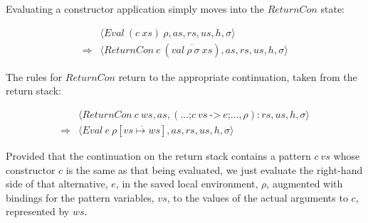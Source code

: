 Evaluating a constructor application simply moves into the $\mathit{ReturnCon}$ state:
\begin{mdframed}
\begin{equation}
\begin{array}{cl}
 & \langle \mathit{Eval}~(c~\mathit{xs})~\rho, \mathit{as}, \mathit{rs}, \mathit{us}, h, \sigma \rangle \\[0.25cm]
\Longrightarrow & \langle \mathit{ReturnCon}~c~(\overline{\mathit{val}~\rho~\sigma~\mathit{xs}}), \mathit{as}, \mathit{rs}, \mathit{us}, h, \sigma \rangle 
\end{array}
\end{equation}
\end{mdframed}
The rules for $\mathit{ReturnCon}$ return to the appropriate continuation, taken from the return stack:
\begin{mdframed}
\begin{equation}
\begin{array}{cl}
 & \langle \mathit{ReturnCon}~c~\mathit{ws}, \mathit{as},  (\ldots \texttt{;} c~\mathit{vs}~\texttt{->}~e \texttt{;} \ldots, \rho) : \mathit{rs}, \mathit{us}, h, \sigma \rangle \\[0.25cm]
\Longrightarrow & \langle \mathit{Eval}~e~\rho[\overline{\mathit{vs} \mapsto \mathit{ws}}], \mathit{as}, \mathit{rs}, \mathit{us}, h, \sigma \rangle
\end{array}
\label{eq:ctrmatch}
\end{equation}
\end{mdframed}
Provided that the continuation on the return stack contains a pattern $c~\mathit{vs}$ whose constructor $c$ is the same as that being evaluated, we just evaluate the right-hand side of that alternative, $e$, in the saved local environment, $\rho$, augmented with bindings for the pattern variables, $\mathit{vs}$, to the values of the actual arguments to $c$, represented by $\mathit{ws}$.

